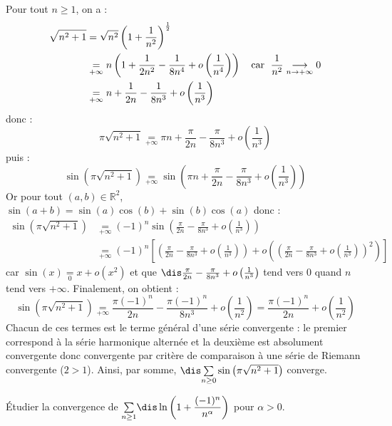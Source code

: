 \documentclass[a4paper,10pt]{report}
\newcommand{\Sum}[2]{\ensuremath{\textstyle{\sum\limits_{#1}^{#2}}}}
\begin{document}
\corr Pour tout $n \geq 1$, on a :
\begin{align*}
\sqrt {n^2 + 1} & = \sqrt{n^2} \left( 1 + \frac{1}{n^2} \right)^{\frac{1}{2}} \\
& \underset{+ \infty}{=} n \left(1 + \frac{1}{2n^2} - \frac{1}{8n^4} + o \left( \frac{1}{n^4} \right) \right) \quad \hbox{car } \; \frac{1}{n^2} \underset{n \rightarrow + \infty}{\longrightarrow} 0\\
& \underset{+ \infty}{=} n + \frac{1}{2n} - \frac{1}{8n^3} +  o \left( \frac{1}{n^3} \right)  
\end{align*}
donc :
$$ \pi \sqrt {n^2 + 1} \underset{+ \infty}{=} \pi n + \frac{\pi}{2n} - \frac{\pi}{8n^3} +  o \left( \frac{1}{n^3} \right)  $$
puis :
$$\sin \left({\pi \sqrt {n^2 + 1}} \right)  \underset{+ \infty}{=} \sin \left(  \pi n + \frac{\pi}{2n} - \frac{\pi}{8n^3} +  o \left( \frac{1}{n^3} \right) \right)$$
Or pour tout $(a,b) \in \mathbb{R}^2$, $\sin(a+b)= \sin(a)\cos(b)+\sin(b) \cos(a)$ donc :
\begin{align*}
 \sin \left({\pi \sqrt {n^2 + 1}} \right)& \underset{+ \infty}{=} (-1)^n \sin \left(\frac{\pi}{2n} - \frac{\pi}{8n^3} +  o \left( \frac{1}{n^3} \right) \right) \\
 & \underset{+ \infty}{=} (-1)^n \left[\left(\frac{\pi}{2n} - \frac{\pi}{8n^3} +  o \left( \frac{1}{n^3} \right) \right) + o \left( \left(\frac{\pi}{2n} - \frac{\pi}{8n^3} +  o \left( \frac{1}{n^3} \right) \right)^2 \right) \right] 
 \end{align*}
car $\sin(x) \underset{0}{=} x + o(x^2)$ et que $\dis \frac{\pi}{2n} - \frac{\pi}{8n^3} +  o \left( \frac{1}{n^3} \right)$ tend vers $0$ quand $n$ tend vers $+ \infty$. Finalement, on obtient :
$$ \sin \left({\pi \sqrt {n^2 + 1}} \right) \underset{+ \infty}{=} \frac{\pi (-1)^n}{2n} - \frac{\pi (-1)^n}{8n^3} +  o \left( \frac{1}{n^2} \right) = \frac{\pi (-1)^n}{2n} +  o \left( \frac{1}{n^2} \right)$$
Chacun de ces termes est le terme général d'une série convergente : le premier correspond à la série harmonique alternée et la deuxième est absolument convergente donc convergente par critère de comparaison à une série de Riemann convergente ($2>1$). Ainsi, par somme, $\dis \Sum{n \geq 0}{} \sin \left({\pi \sqrt {n^2 + 1}} \right)$ converge.

\medskip



\begin{Exa} Étudier la convergence de $\Sum{n \geq 1}{} \dis \ln \left( 1 + \dfrac{(-1)^n}{n^{\alpha}} \right)$ pour $\alpha>0$.
\end{Exa} 
\end{document}
